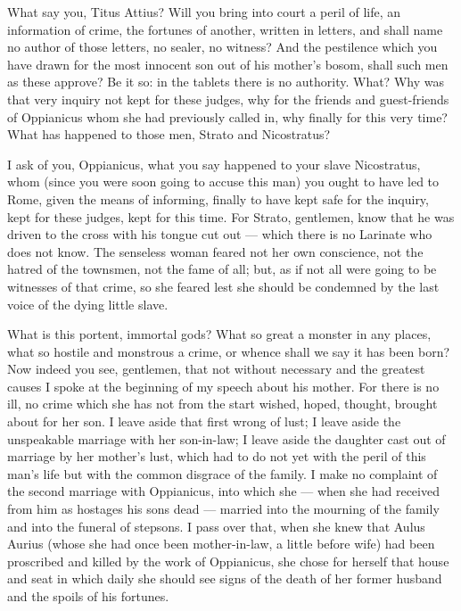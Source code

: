  What say you, Titus Attius? Will you bring into court a peril of life, an information of crime, the fortunes of another, written in letters, and shall name no author of those letters, no sealer, no witness? And the pestilence which you have drawn for the most innocent son out of his mother's bosom, shall such men as these approve? Be it so: in the tablets there is no authority. What? Why was that very inquiry not kept for these judges, why for the friends and guest-friends of Oppianicus whom she had previously called in, why finally for this very time? What has happened to those men, Strato and Nicostratus?

 I ask of you, Oppianicus, what you say happened to your slave Nicostratus, whom (since you were soon going to accuse this man) you ought to have led to Rome, given the means of informing, finally to have kept safe for the inquiry, kept for these judges, kept for this time. For Strato, gentlemen, know that he was driven to the cross with his tongue cut out --- which there is no Larinate who does not know. The senseless woman feared not her own conscience, not the hatred of the townsmen, not the fame of all; but, as if not all were going to be witnesses of that crime, so she feared lest she should be condemned by the last voice of the dying little slave.

 What is this portent, immortal gods? What so great a monster in any places, what so hostile and monstrous a crime, or whence shall we say it has been born? Now indeed you see, gentlemen, that not without necessary and the greatest causes I spoke at the beginning of my speech about his mother. For there is no ill, no crime which she has not from the start wished, hoped, thought, brought about for her son. I leave aside that first wrong of lust; I leave aside the unspeakable marriage with her son-in-law; I leave aside the daughter cast out of marriage by her mother's lust, which had to do not yet with the peril of this man's life but with the common disgrace of the family. I make no complaint of the second marriage with Oppianicus, into which she --- when she had received from him as hostages his sons dead --- married into the mourning of the family and into the funeral of stepsons. I pass over that, when she knew that Aulus Aurius (whose she had once been mother-in-law, a little before wife) had been proscribed and killed by the work of Oppianicus, she chose for herself that house and seat in which daily she should see signs of the death of her former husband and the spoils of his fortunes.

